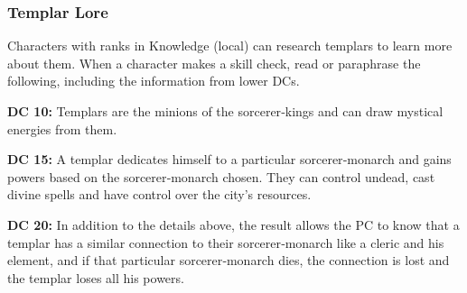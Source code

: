 \subsubsection{Templar Lore}
Characters with ranks in Knowledge (local) can research templars to learn more about them. When a character makes a skill check, read or paraphrase the following, including the information from lower DCs.

\textbf{DC 10:} Templars are the minions of the sorcerer‐kings and can draw mystical energies from them.

\textbf{DC 15:} A templar dedicates himself to a particular sorcerer‐monarch and gains powers based on the sorcerer‐monarch chosen. They can control undead, cast divine spells and have control over the city's resources.

\textbf{DC 20:} In addition to the details above, the result allows the PC to know that a templar has a similar connection to their sorcerer‐monarch like a cleric and his element, and if that particular sorcerer‐monarch dies, the connection is lost and the templar loses all his powers.